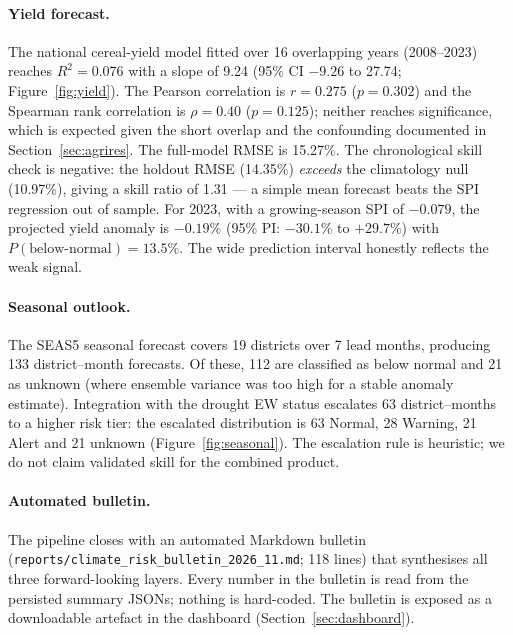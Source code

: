 \documentclass[preprint,12pt]{elsarticle}
\begin{document}
\paragraph{Yield forecast.}
The national cereal-yield model fitted over 16 overlapping years (2008--2023)
reaches $R^2 = 0.076$ with a slope of 9.24 (95\% CI $-9.26$ to 27.74;
Figure~\ref{fig:yield}). The Pearson correlation is $r = 0.275$ ($p = 0.302$)
and the Spearman rank correlation is $\rho = 0.40$ ($p = 0.125$); neither
reaches significance, which is expected given the short overlap and the
confounding documented in Section~\ref{sec:agrires}. The full-model RMSE is
15.27\%. The chronological skill check is negative: the holdout RMSE (14.35\%)
\emph{exceeds} the climatology null (10.97\%), giving a skill ratio of 1.31 ---
a simple mean forecast beats the SPI regression out of sample. For 2023, with a
growing-season SPI of $-0.079$, the projected yield anomaly is $-0.19\%$ (95\%
PI: $-30.1\%$ to $+29.7\%$) with $P(\text{below-normal}) = 13.5\%$. The wide
prediction interval honestly reflects the weak signal.

\paragraph{Seasonal outlook.}
The SEAS5 seasonal forecast covers 19 districts over 7 lead months, producing
133 district--month forecasts. Of these, 112 are classified as below normal and
21 as unknown (where ensemble variance was too high for a stable anomaly
estimate). Integration with the drought EW status escalates 63 district--months
to a higher risk tier: the escalated distribution is 63 Normal, 28 Warning,
21 Alert and 21 unknown (Figure~\ref{fig:seasonal}). The escalation rule is
heuristic; we do not claim validated skill for the combined product.

\paragraph{Automated bulletin.}
The pipeline closes with an automated Markdown bulletin
(\texttt{reports/climate\_risk\_bulletin\_2026\_11.md}; 118 lines) that
synthesises all three forward-looking layers. Every number in the bulletin is
read from the persisted summary JSONs; nothing is hard-coded. The bulletin is
exposed as a downloadable artefact in the dashboard
(Section~\ref{sec:dashboard}).
\end{document}
